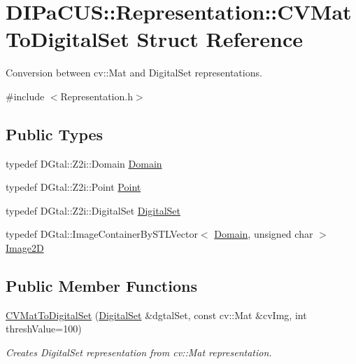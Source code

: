 \hypertarget{structDIPaCUS_1_1Representation_1_1CVMatToDigitalSet}{}\section{D\+I\+Pa\+C\+US\+:\+:Representation\+:\+:C\+V\+Mat\+To\+Digital\+Set Struct Reference}
\label{structDIPaCUS_1_1Representation_1_1CVMatToDigitalSet}


Conversion between cv\+::\+Mat and Digital\+Set representations.  




{\ttfamily \#include $<$Representation.\+h$>$}

\subsection*{Public Types}
\begin{DoxyCompactItemize}
\item 
typedef D\+Gtal\+::\+Z2i\+::\+Domain \mbox{\hyperlink{structDIPaCUS_1_1Representation_1_1CVMatToDigitalSet_a105fa216170e3f3a3722444b0cb7e71b}{Domain}}
\item 
typedef D\+Gtal\+::\+Z2i\+::\+Point \mbox{\hyperlink{structDIPaCUS_1_1Representation_1_1CVMatToDigitalSet_adad5bdd19c3c97ae7b6aad32211a2430}{Point}}
\item 
typedef D\+Gtal\+::\+Z2i\+::\+Digital\+Set \mbox{\hyperlink{structDIPaCUS_1_1Representation_1_1CVMatToDigitalSet_ab7e5df61bd4397642ff888bcca66a4dc}{Digital\+Set}}
\item 
typedef D\+Gtal\+::\+Image\+Container\+By\+S\+T\+L\+Vector$<$ \mbox{\hyperlink{structDIPaCUS_1_1Representation_1_1CVMatToDigitalSet_a105fa216170e3f3a3722444b0cb7e71b}{Domain}}, unsigned char $>$ \mbox{\hyperlink{structDIPaCUS_1_1Representation_1_1CVMatToDigitalSet_a89c01e1bec79da4c4592499f6ad3c70a}{Image2D}}
\end{DoxyCompactItemize}
\subsection*{Public Member Functions}
\begin{DoxyCompactItemize}
\item 
\mbox{\hyperlink{structDIPaCUS_1_1Representation_1_1CVMatToDigitalSet_ad6c4afb2204d91753aa97dd48795c218}{C\+V\+Mat\+To\+Digital\+Set}} (\mbox{\hyperlink{structDIPaCUS_1_1Representation_1_1CVMatToDigitalSet_ab7e5df61bd4397642ff888bcca66a4dc}{Digital\+Set}} \&dgtal\+Set, const cv\+::\+Mat \&cv\+Img, int thresh\+Value=100)
\begin{DoxyCompactList}\small\item\em Creates Digital\+Set representation from cv\+::\+Mat representation. \end{DoxyCompactList}\end{DoxyCompactItemize}


